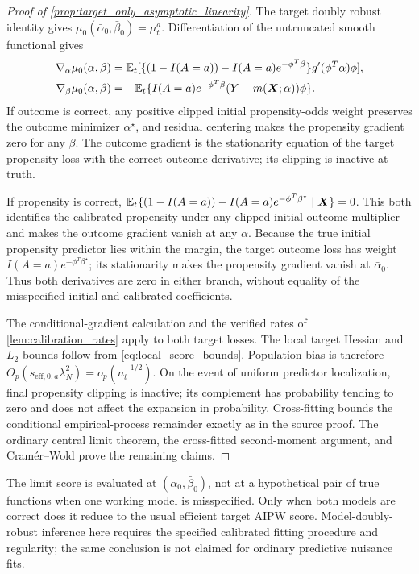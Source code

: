 \documentclass[12pt]{article}
\begin{document}
\begin{proof}[Proof of \cref{prop:target_only_asymptotic_linearity}]
The target doubly robust identity gives $\mu_0(\bar\alpha_0,\bar\beta_0)=\mu_t^a$. Differentiation of the untruncated smooth functional gives
\[
\begin{aligned}
\nabla_\alpha \mu_0(\alpha,\beta)
&=\mathbb{E}_t[\{(1-I(A=a))-I(A=a)e^{-\phi^T\beta}\}g'(\phi^T\alpha)\phi],\\
\nabla_\beta \mu_0(\alpha,\beta)
&=-\mathbb{E}_t\{I(A=a)e^{-\phi^T\beta}(Y-m(\boldsymbol X;\alpha))\phi\}.
\end{aligned}
\]
If outcome is correct, any positive clipped initial propensity-odds weight preserves the outcome minimizer $\alpha^\star$, and residual centering makes the propensity gradient zero for any $\beta$. The outcome gradient is the stationarity equation of the target propensity loss with the correct outcome derivative; its clipping is inactive at truth.

If propensity is correct, $\mathbb{E}_t\{(1-I(A=a))-I(A=a)e^{-\phi^T\beta^\star}\mid\boldsymbol X\}=0$. This both identifies the calibrated propensity under any clipped initial outcome multiplier and makes the outcome gradient vanish at any $\alpha$. Because the true initial propensity predictor lies within the margin, the target outcome loss has weight $I(A=a)e^{-\phi^T\beta^\star}$; its stationarity makes the propensity gradient vanish at $\bar\alpha_0$. Thus both derivatives are zero in either branch, without equality of the misspecified initial and calibrated coefficients.

The conditional-gradient calculation and the verified rates of \cref{lem:calibration_rates} apply to both target losses. The local target Hessian and $L_2$ bounds follow from \cref{eq:local_score_bounds}. Population bias is therefore $O_p(s_{\mathrm{eff},0,a}\lambda_N^2)=o_p(n_t^{-1/2})$. On the event of uniform predictor localization, final propensity clipping is inactive; its complement has probability tending to zero and does not affect the expansion in probability. Cross-fitting bounds the conditional empirical-process remainder exactly as in the source proof. The ordinary central limit theorem, the cross-fitted second-moment argument, and Cram\'er--Wold prove the remaining claims.
\end{proof}

The limit score is evaluated at $(\bar\alpha_0,\bar\beta_0)$, not at a hypothetical pair of true functions when one working model is misspecified. Only when both models are correct does it reduce to the usual efficient target AIPW score. Model-doubly-robust inference here requires the specified calibrated fitting procedure and regularity; the same conclusion is not claimed for ordinary predictive nuisance fits.
\end{document}
